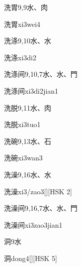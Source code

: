 \begin{Entry}{洗胃}{9,9}{⽔、⾁}
  \begin{Phonetics}{洗胃}{xi3wei4}
  \end{Phonetics}
\end{Entry}

\begin{Entry}{洗涤}{9,10}{⽔、⽔}
  \begin{Phonetics}{洗涤}{xi3di2}
  \end{Phonetics}
\end{Entry}

\begin{Entry}{洗涤间}{9,10,7}{⽔、⽔、⾨}
  \begin{Phonetics}{洗涤间}{xi3di2jian1}
  \end{Phonetics}
\end{Entry}

\begin{Entry}{洗脱}{9,11}{⽔、⾁}
  \begin{Phonetics}{洗脱}{xi3tuo1}
  \end{Phonetics}
\end{Entry}

\begin{Entry}{洗碗}{9,13}{⽔、⽯}
  \begin{Phonetics}{洗碗}{xi3wan3}
  \end{Phonetics}
\end{Entry}

\begin{Entry}{洗澡}{9,16}{⽔、⽔}
  \begin{Phonetics}{洗澡}{xi3/zao3}[][HSK 2]
  \end{Phonetics}
\end{Entry}

\begin{Entry}{洗澡间}{9,16,7}{⽔、⽔、⾨}
  \begin{Phonetics}{洗澡间}{xi3zao3jian1}
  \end{Phonetics}
\end{Entry}

\begin{Entry}{洞}{9}{⽔}
  \begin{Phonetics}{洞}{dong4}[][HSK 5]
  \end{Phonetics}
\end{Entry}

